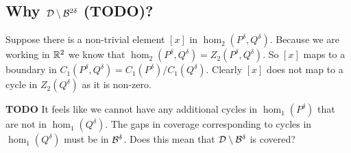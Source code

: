 \clearpage
\subsection{Why ${\mathcal{D}}\setminus{\mathcal{B}}^{2\delta}$ (TODO)?}

%
%
%
%



Suppose there is a non-trivial element $[x]$ in $\hom_2(P^\delta, Q^\delta)$.
Because we are working in $\mathbb{R}^2$ we know that $\hom_2(P^\delta, Q^\delta) = Z_2(P^\delta, Q^\delta)$.
So $[x]$ maps to a boundary in $C_1(P^\delta, Q^\delta) = C_1(P^\delta) / C_1(Q^\delta)$.
Clearly $[x]$ does not map to a cycle in $Z_2(Q^\delta)$ as it is non-zero.

\textbf{TODO} It feels like we cannot have any additional cycles in $\hom_1(P^\delta)$ that are not in $\hom_1(Q^\delta)$.
The gaps in coverage corresponding to cycles in $\hom_1(Q^\delta)$ must be in ${\mathcal{B}}^\delta$.
Does this mean that ${\mathcal{D}}\setminus{\mathcal{B}}^\delta$ is covered?


